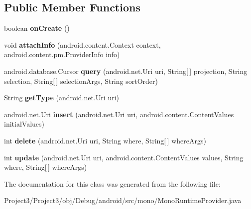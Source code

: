 \subsection*{Public Member Functions}
\begin{DoxyCompactItemize}
\item 
\mbox{\label{classmono_1_1MonoRuntimeProvider_ac5640d3ce8472accc1953fe591e683c3}} 
boolean {\bfseries on\+Create} ()
\item 
\mbox{\label{classmono_1_1MonoRuntimeProvider_a4fb9f5a38268fb642d211e7ef0fd9228}} 
void {\bfseries attach\+Info} (android.\+content.\+Context context, android.\+content.\+pm.\+Provider\+Info info)
\item 
\mbox{\label{classmono_1_1MonoRuntimeProvider_a5f038667e16324d54f940968f4abd86f}} 
android.\+database.\+Cursor {\bfseries query} (android.\+net.\+Uri uri, String\mbox{[}$\,$\mbox{]} projection, String selection, String\mbox{[}$\,$\mbox{]} selection\+Args, String sort\+Order)
\item 
\mbox{\label{classmono_1_1MonoRuntimeProvider_ab7978ccd79378f86aabc9a1997bff129}} 
String {\bfseries get\+Type} (android.\+net.\+Uri uri)
\item 
\mbox{\label{classmono_1_1MonoRuntimeProvider_afbf0b2575d76132ac379064f3f695013}} 
android.\+net.\+Uri {\bfseries insert} (android.\+net.\+Uri uri, android.\+content.\+Content\+Values initial\+Values)
\item 
\mbox{\label{classmono_1_1MonoRuntimeProvider_a20fd29ee82e2fbc6ca8e3a7d53e89b9f}} 
int {\bfseries delete} (android.\+net.\+Uri uri, String where, String\mbox{[}$\,$\mbox{]} where\+Args)
\item 
\mbox{\label{classmono_1_1MonoRuntimeProvider_a70342b01de97d26ab215db961f4a714c}} 
int {\bfseries update} (android.\+net.\+Uri uri, android.\+content.\+Content\+Values values, String where, String\mbox{[}$\,$\mbox{]} where\+Args)
\end{DoxyCompactItemize}


The documentation for this class was generated from the following file\+:\begin{DoxyCompactItemize}
\item 
Project3/\+Project3/obj/\+Debug/android/src/mono/Mono\+Runtime\+Provider.\+java\end{DoxyCompactItemize}
